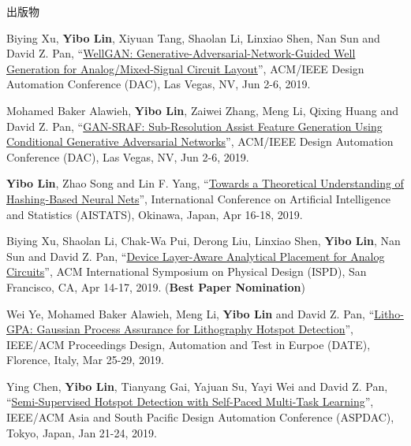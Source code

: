 \begin{rSection}{出版物}
\begin{description}[font=\normalfont, rightmargin=2em]
\item[{[C26]}]{
        Biying Xu, \textbf{Yibo Lin}, Xiyuan Tang, Shaolan Li, Linxiao Shen, Nan Sun and David Z. Pan, 
    ``\href{https://doi.org/10.1145/3316781.3317930}{WellGAN: Generative-Adversarial-Network-Guided Well Generation for Analog/Mixed-Signal Circuit Layout}'', 
    ACM/IEEE Design Automation Conference (DAC), Las Vegas, NV, Jun 2-6, 2019.
    
}
            

\item[{[C25]}]{
        Mohamed Baker Alawieh, \textbf{Yibo Lin}, Zaiwei Zhang, Meng Li, Qixing Huang and David Z. Pan, 
    ``\href{https://doi.org/10.1145/3316781.3317832}{GAN-SRAF: Sub-Resolution Assist Feature Generation Using Conditional Generative Adversarial Networks}'', 
    ACM/IEEE Design Automation Conference (DAC), Las Vegas, NV, Jun 2-6, 2019.
    
}
            

\item[{[C24]}]{
        \textbf{Yibo Lin}, Zhao Song and Lin F. Yang, 
    ``\href{https://arxiv.org/abs/1812.10244}{Towards a Theoretical Understanding of Hashing-Based Neural Nets}'', 
    International Conference on Artificial Intelligence and Statistics (AISTATS), Okinawa, Japan, Apr 16-18, 2019.
    
}
            

\item[{[C23]}]{
        Biying Xu, Shaolan Li, Chak-Wa Pui, Derong Liu, Linxiao Shen, \textbf{Yibo Lin}, Nan Sun and David Z. Pan, 
    ``\href{https://doi.org/10.1145/3299902.3309751}{Device Layer-Aware Analytical Placement for Analog Circuits}'', 
    ACM International Symposium on Physical Design (ISPD), San Francisco, CA, Apr 14-17, 2019.
    (\textbf{Best Paper Nomination})
}
            

\item[{[C22]}]{
        Wei Ye, Mohamed Baker Alawieh, Meng Li, \textbf{Yibo Lin} and David Z. Pan, 
    ``\href{https://doi.org/10.23919/DATE.2019.8714960}{Litho-GPA: Gaussian Process Assurance for Lithography Hotspot Detection}'', 
    IEEE/ACM Proceedings Design, Automation and Test in Eurpoe (DATE), Florence, Italy, Mar 25-29, 2019.
    
}
            

\item[{[C21]}]{
        Ying Chen, \textbf{Yibo Lin}, Tianyang Gai, Yajuan Su, Yayi Wei and David Z. Pan, 
    ``\href{https://doi.org/10.1145/3287624.3287685}{Semi-Supervised Hotspot Detection with Self-Paced Multi-Task Learning}'', 
    IEEE/ACM Asia and South Pacific Design Automation Conference (ASPDAC), Tokyo, Japan, Jan 21-24, 2019.
    
}
\end{description}
\end{rSection}
